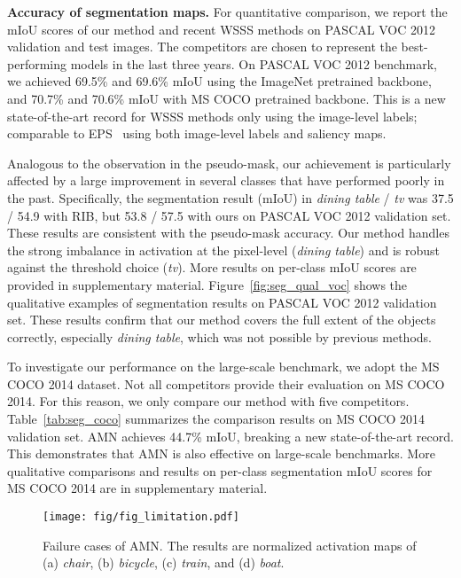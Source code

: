 \documentclass[10pt,twocolumn,letterpaper]{article}
\begin{document}
\vspace{1mm}
\noindent\textbf{Accuracy of segmentation maps.} 
For quantitative comparison, we report the mIoU scores of our method and recent WSSS methods on PASCAL VOC 2012 validation and test images. The competitors are chosen to represent the best-performing models in the last three years. On PASCAL VOC 2012 benchmark, we achieved 69.5\% and 69.6\% mIoU using the ImageNet pretrained backbone, and 70.7\% and 70.6\% mIoU with MS COCO pretrained backbone. This is a new state-of-the-art record for WSSS methods only using the image-level labels; comparable to EPS~\cite{Lee_2021_CVPR} using both image-level labels and saliency maps. 

Analogous to the observation in the pseudo-mask, our achievement is particularly affected by a large improvement in several classes that have performed poorly in the past. Specifically, the segmentation result (mIoU) in \textit{dining table} / \textit{tv} was 37.5 / 54.9 with RIB, but 53.8 / 57.5 with ours on PASCAL VOC 2012 validation set. These results are consistent with the pseudo-mask accuracy. Our method handles the strong imbalance in activation at the pixel-level (\textit{dining table}) and is robust against the threshold choice (\textit{tv}). More results on per-class mIoU scores are provided in supplementary material. Figure~\ref{fig:seg_qual_voc} shows the qualitative examples of segmentation results on PASCAL VOC 2012 validation set. These results confirm that our method covers the full extent of the objects correctly, especially \textit{dining table}, which was not possible by previous methods.

To investigate our performance on the large-scale benchmark, we adopt the MS COCO 2014 dataset. Not all competitors provide their evaluation on MS COCO 2014. For this reason, we only compare our method with five competitors. Table~\ref{tab:seg_coco} summarizes the comparison results on MS COCO 2014 validation set. AMN achieves 44.7\% mIoU, breaking a new state-of-the-art record. This demonstrates that AMN is also effective on large-scale benchmarks. More qualitative comparisons and results on per-class segmentation mIoU scores for MS COCO 2014 are in supplementary material.

\begin{figure}[t]
\begin{center}
\texttt{[image: fig/fig\_limitation.pdf]}
\end{center}
\vspace{-6mm}
\caption{Failure cases of AMN. The results are normalized activation maps of (a) \textit{chair}, (b) \textit{bicycle}, (c) \textit{train}, and (d) \textit{boat}.}

\label{fig:limitation}
\vspace{-4mm}
\end{figure} 
\end{document}
